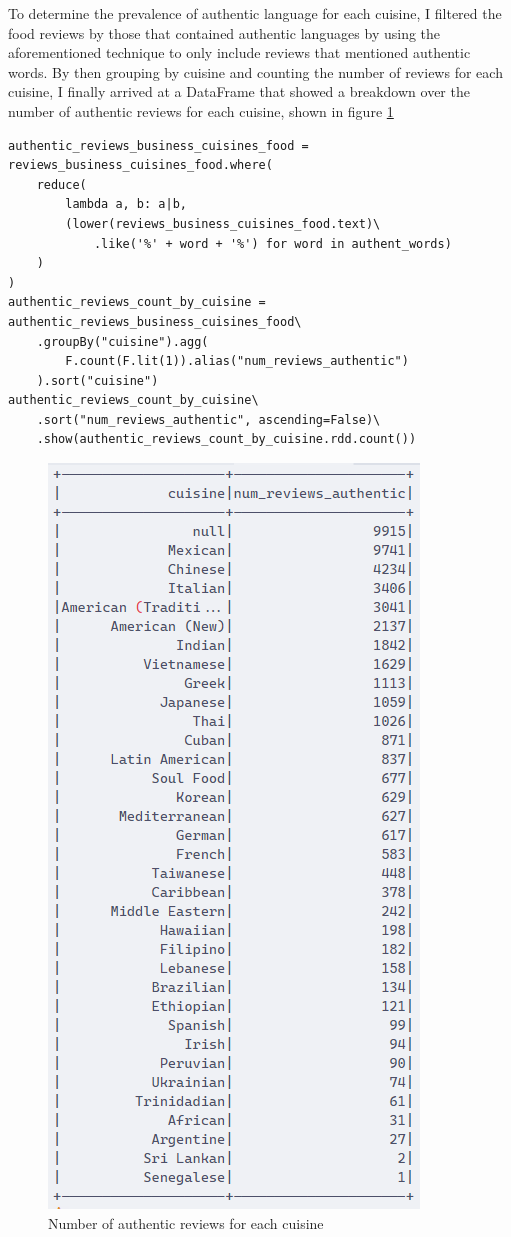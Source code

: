 To determine the prevalence of authentic language for each cuisine, I filtered the food reviews by those that contained authentic languages by using the aforementioned technique to only include reviews that mentioned authentic words. By then grouping by cuisine and counting the number of reviews for each cuisine, I finally arrived at a DataFrame that showed a breakdown over the number of authentic reviews for each cuisine, shown in figure \ref{fig:auth_cuisines}

\begin{verbatim}
authentic_reviews_business_cuisines_food = reviews_business_cuisines_food.where(
    reduce(
        lambda a, b: a|b,
        (lower(reviews_business_cuisines_food.text)\
            .like('%' + word + '%') for word in authent_words)
    )
)
authentic_reviews_count_by_cuisine = authentic_reviews_business_cuisines_food\
    .groupBy("cuisine").agg(
        F.count(F.lit(1)).alias("num_reviews_authentic")
    ).sort("cuisine")
authentic_reviews_count_by_cuisine\
    .sort("num_reviews_authentic", ascending=False)\
    .show(authentic_reviews_count_by_cuisine.rdd.count())
\end{verbatim}

\begin{figure}
    \centering
    \includegraphics[width=0.5\linewidth]{images/num_auth_cuisines.png}
    \caption{Number of authentic reviews for each cuisine}
    \label{fig:auth_cuisines}
\end{figure}


